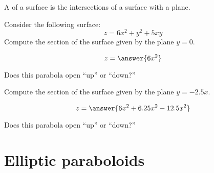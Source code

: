 \documentclass{ximera}
\begin{document}
\begin{definition}
  A  of a surface is the intersections of a surface with
  a plane.
\end{definition}

\begin{question}
  Consider the following surface:
  \[
  z = 6x^2 + y^2 + 5 xy
  \]
  Compute the section of the surface given by the plane $y=0$.
  \begin{prompt}
    \[
    z = \answer{6x^2}
    \]
  \end{prompt}
  \begin{question}
    Does this parabola open ``up'' or ``down?''
    \begin{prompt}
    \begin{multipleChoice}
    \end{multipleChoice}
    \end{prompt}
    \begin{question}
      Compute the section of the surface given by the plane $y=-2.5 x$.
      \begin{prompt}
        \[
        z = \answer{6x^2 + 6.25 x^2 - 12.5x^2}
        \]
      \end{prompt}
      \begin{question}
        Does this parabola open ``up'' or ``down?''
        \begin{prompt}
          \begin{multipleChoice}
          \end{multipleChoice}
        \end{prompt}
      \end{question}
    \end{question}
  \end{question}
\end{question}

  





\section{Elliptic paraboloids}
\end{document}
